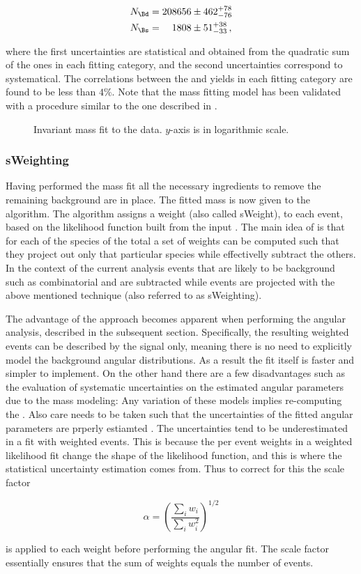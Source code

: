 \begin{align}
N_{\Bd} &= 208656  \pm  462 ^{+ 78	}_{- 76}\\
N_{\Bs} &= \phantom{00}1808  \pm   51 ^{+ 38	}_{- 33} \, ,
\label{signal_yields}
\end{align}

\noindent where the first uncertainties are statistical and obtained from the quadratic sum of the ones in each fitting category,
and the second uncertainties correspond to systematical. The correlations between the \Bd and \Bs yields in each fitting category
are found to be less than $4\%$. Note that the mass fitting model has been validated with a procedure similar to the
one described in .

\begin{figure}[h]
\begin{center}
  \scalebox{0.5}{}
  \caption{Invariant mass fit to the data. $y$-axis is in logarithmic scale.}
  \label{mass_plot}
\end{center}
\end{figure}

\subsubsection{sWeighting}
Having performed the mass fit all the necessary ingredients to remove the remaining background are in place.
The fitted mass \pdf is now given to the \sPlot algorithm. The algorithm assigns a weight (also called sWeight), to each event,
based on the likelihood function built from the input \pdf. The main idea of \sPlot is that for each of the species of the total
\pdf a set of weights can be computed such that they project out only that particular species while effectivelly subtract the others.
In the context of the current analysis events that are likely to be background such as combinatorial and \LbJpsipK are
subtracted while \BJpsiKst events are projected with the above mentioned technique (also referred to as sWeighting).

The advantage of the \sWeights approach becomes apparent when performing the angular analysis, described in the subsequent section.
Specifically, the resulting weighted events can be described by the signal \pdf only, meaning there is no need to explicitly model
the background angular distributions. As a result the fit itself is faster and simpler to implement. On the other hand there are a few
disadvantages such as the evaluation of systematic uncertainties on the estimated angular parameters due to the mass \pdf modeling:
Any variation of these models implies re-computing the \sWeights. Also care needs to be taken such that the uncertainties
of the fitted angular parameters are prperly estiamted \cite{splot}. The uncertainties tend to be underestimated in a fit with weighted
events. This is because the per event weights in a weighted likelihood fit change the shape of the likelihood function, and this is
where the statistical uncertainty estimation comes from. Thus to correct for this the scale factor

\begin{equation}
\alpha = \left(\frac{\sum_{i} w_i}{\sum_{i} w_i^2}\right)^{1/2}
\label{sWeights_scale_factor}
\end{equation}

\noindent is applied to each weight before performing the angular fit. The scale factor essentially ensures that the sum of weights
equals the  number of events.
